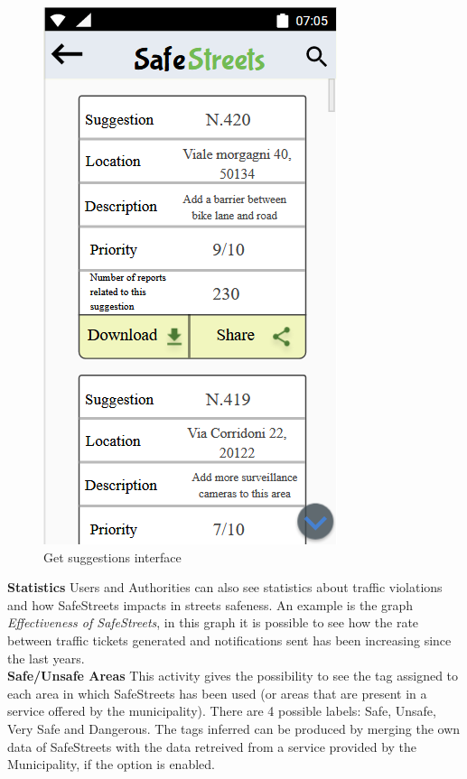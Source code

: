     \vspace{5mm}
    
       \begin{figure}[h]
        \centering
        \includegraphics[scale=1]{Images/suggestions.png}
        \caption{Get suggestions interface}
    \end{figure}\vspace{5mm}
    
    \newpage
    
    \noindent\textbf{Statistics}\newline
    Users and Authorities can also see statistics about traffic violations and how SafeStreets impacts in streets safeness. An example is the graph \textit{Effectiveness of SafeStreets}, in this graph it is possible to see how the rate between traffic tickets generated and notifications sent has been increasing since the last years.\\
    
    \noindent\textbf{Safe/Unsafe Areas}\newline
    This activity gives the possibility to see the tag assigned to each area in which SafeStreets has been used (or areas that are present in a service offered by the municipality). There are 4 possible labels: Safe, Unsafe, Very Safe and Dangerous. The tags inferred can be produced by merging the own data of SafeStreets with the data retreived from a service provided by the Municipality, if the option is enabled.
    \vspace{0.3cm}
    
